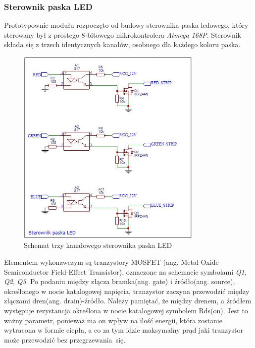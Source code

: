\documentclass[12pt, eng, twoside, openany, final]{mgr}
\begin{document}
            \subsubsection{Sterownik paska LED}
                Prototypownie modułu rozpoczęto od budowy sterownika paska ledowego, który sterowany był z prostego 8-bitowego mikrokontrolera \emph{Atmega 168P}. 
                Sterownik składa się z trzech identycznych kanałów, osobnego dla każdego koloru paska. 
                \begin{figure}[H]
                \begin{center}
                    \includegraphics[width=0.8\textwidth]{sterownik1.jpg}
                    \caption{Schemat trzy kanałowego sterownika paska LED}
                \end{center}
                \end{figure}
                Elementem wykonawczym są tranzystory MOSFET (ang. Metal-Oxide Semiconductor Field-Effect Transistor), oznaczone na schemacie symbolami \emph{Q1}, \emph{Q2}, \emph{Q3}. Po podaniu między złącza bramka(ang. gate) i źródło(ang. source), określonego w nocie katalogowej\cite{irfz44nData} napięcia, tranzystor zaczyna przewodzić między złączami dren(ang. drain)-źródło. Należy pamiętać, że między drenem, a źródłem występuje rezystancja określona w nocie katalogowej symbolem Rds(on). Jest to ważny parametr, ponieważ ma on wpływ na ilość energii, która zostanie wytracona w formie ciepła, a co za tym idzie maksymalny prąd jaki tranzystor może przewodzić bez przegrzewania~się.
\end{document}
